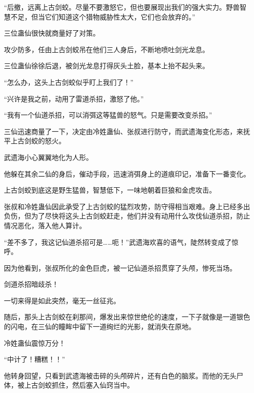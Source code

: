 \begin{this_body}
“后撤，远离上古剑蛟。尽量不要激怒它，但也要展现出我们的强大实力。野兽智慧不足，但当它们知道这个猎物威胁性太大，它们也会放弃的。”

三位蛊仙很快就商量好了对策。

攻少防多，任由上古剑蛟吊在他们三人身后，不断地喷吐剑光龙息。

三位蛊仙徐徐后退，被剑光龙息打得灰头土脸，基本上抬不起头来。

“怎么办，这头上古剑蛟似乎盯上我们了！”

“兴许是我之前，动用了雷道杀招，激怒了他。”

“我有一个仙道杀招，可以消弭这等猛兽的怒气。只是需要改变杀招。”

三仙迅速商量了一下，决定由冷姓蛊仙、张叔进行防守，而武遗海变化形态，来抚平上古剑蛟的怒火。

武遗海小心翼翼地化为人形。

他躲在其余二仙的身后，催动手段，迅速消弭身上的道痕印记，准备下一番变化。

上古剑蛟到底这是野生猛兽，智慧低下，一味地朝着巨狼和金虎攻击。

张叔和冷姓蛊仙因此承受了上古剑蛟的猛烈攻势，防守得相当艰难。身上已经多出负伤，但为了尽快将这头上古剑蛟赶走，他们并没有动用什么攻伐仙道杀招，防止情况恶化，落入他人算计。

“差不多了，我这记仙道杀招可是……呃！”武遗海欢喜的语气，陡然转变成了惊呼。

因为他看到，张叔所化的金色巨虎，被一记仙道杀招贯穿了头颅，惨死当场。

剑道杀招暗歧杀！

一切来得是如此突然，毫无一丝征兆。

随后，那头上古剑蛟在刹那间，爆发出来惊世绝伦的速度，一下子就像是一道银色的闪电，在三仙的瞳眸中留下一道绚烂的光影，就消失在原地。

冷姓蛊仙震惊万分！

“中计了！糟糕！！”

他转身回望，只看到武遗海被击碎的头颅碎片，还有白色的脑浆。而他的无头尸体，被上古剑蛟抓住，然后塞入仙窍当中。

\end{this_body}

